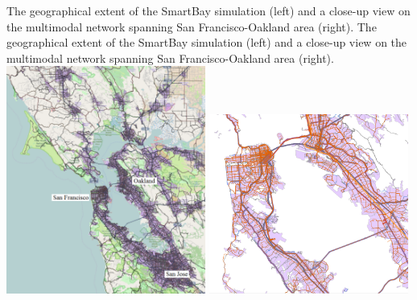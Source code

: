 \createfigure%
{The geographical extent of the SmartBay simulation (left) and a close-up view on the multimodal network spanning San Francisco-Oakland area (right).}%
{The geographical extent of the SmartBay simulation (left) and a close-up view on the multimodal network spanning San Francisco-Oakland area (right).}%
{\label{fig:sf1}}%
{%
 \createsubfigure%
 {}
 {\includegraphics[width=0.49\textwidth, angle=0]{./scenarios/figures/sf_fig1_left.png}}
 {\label{fig:sf_fig1_left}}
\createsubfigure%
 {}
 {\includegraphics[width=0.49\textwidth, angle=0]{./scenarios/figures/sf_fig1_right.png}}
 {\label{fig:sf_fig1_right}}
}%
{}
